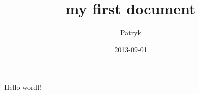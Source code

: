 \documentclass{article}
\title{my first document}
\date{2013-09-01}
\author{Patryk }
\begin{document}
	\maketitle
	\newpage

	Hello wordl!
\end{document}
